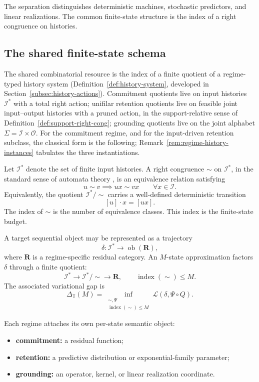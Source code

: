\documentclass[12pt]{article}
\theoremstyle{definition}
\begin{document}
The separation distinguishes deterministic machines, stochastic predictors,
and linear realizations.  The common finite-state structure is the index of a
right congruence on histories.

\subsection{The shared finite-state schema}
\label{subsec:shared-schema-intro}

The shared combinatorial resource is the index of a finite quotient of a
regime-typed history system (Definition~\ref{def:history-system}, developed in
Section~\ref{subsec:history-actions}).
Commitment quotients live on input histories $\mathcal I^*$ with a total right
action; unifilar retention quotients live on feasible joint input--output
histories with a pruned action, in the support-relative sense of
Definition~\ref{def:support-right-cong}; grounding quotients live on the joint
alphabet $\Sigma=\mathcal I\times\mathcal O$.  For the commitment regime, and
for the input-driven retention subclass, the classical form is the following;
Remark~\ref{rem:regime-history-instances} tabulates the three instantiations.

Let $\mathcal I^*$ denote the set of finite input histories.  A right
congruence $\sim$ on $\mathcal I^*$, in the standard sense of automata theory
\cite{sakarovitch2009}, is an equivalence relation satisfying
\[
u\sim v
\implies
ux\sim vx
\qquad
\forall x\in\mathcal I.
\]
Equivalently, the quotient $\mathcal I^*/\!\sim$ carries a well-defined
deterministic transition
\[
[u]\cdot x=[ux].
\]
The index of $\sim$ is the number of equivalence classes.  This index is the
finite-state budget.

A target sequential object may be represented as a trajectory
\[
\delta:\mathcal I^*\to\operatorname{ob}(\mathbf R),
\]
where $\mathbf R$ is a regime-specific residual category.  An $M$-state
approximation factors $\delta$ through a finite quotient:
\[
\mathcal I^*
\longrightarrow
\mathcal I^*/\!\sim
\longrightarrow
\mathbf R,
\qquad
\operatorname{index}(\sim)\le M.
\]
The associated variational gap is
\[
\Delta_{\mathbb T}(M)
=
\inf_{\substack{\sim,\Psi\\ \operatorname{index}(\sim)\le M}}
\mathcal L(\delta,\Psi\circ Q).
\]

Each regime attaches its own per-state semantic object:
\begin{itemize}[nosep]
\item \textbf{commitment:} a residual function;
\item \textbf{retention:} a predictive distribution or exponential-family
parameter;
\item \textbf{grounding:} an operator, kernel, or linear realization
coordinate.
\end{itemize}
\end{document}

